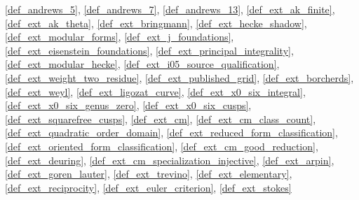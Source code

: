 \documentclass[11pt,a4paper]{article}
\numberwithin{equation}{section}
\theoremstyle{plain}\newtheorem{theorem}{Theorem}[section]\newaliascnt{proposition}{theorem}\newtheorem{proposition}[proposition]{Proposition}\aliascntresetthe{proposition}\newaliascnt{lemma}{theorem}\newtheorem{lemma}[lemma]{Lemma}\aliascntresetthe{lemma}
\theoremstyle{definition}\newaliascnt{definition}{theorem}\newtheorem{definition}[definition]{Definition}\aliascntresetthe{definition}\newaliascnt{notation}{theorem}\newtheorem{notation}[notation]{Notation}\aliascntresetthe{notation}
\begin{document}
\begin{uses-statement}\ref{def_andrews_5}, \ref{def_andrews_7}, \ref{def_andrews_13}, \ref{def_ext_ak_finite}, \ref{def_ext_ak_theta}, \ref{def_ext_bringmann}, \ref{def_ext_hecke_shadow}, \ref{def_ext_modular_forms}, \ref{def_ext_j_foundations}, \ref{def_ext_eisenstein_foundations}, \ref{def_ext_principal_integrality}, \ref{def_ext_modular_hecke}, \ref{def_ext_i05_source_qualification}, \ref{def_ext_weight_two_residue}, \ref{def_ext_published_grid}, \ref{def_ext_borcherds}, \ref{def_ext_weyl}, \ref{def_ext_ligozat_curve}, \ref{def_ext_x0_six_integral}, \ref{def_ext_x0_six_genus_zero}, \ref{def_ext_x0_six_cusps}, \ref{def_ext_squarefree_cusps}, \ref{def_ext_cm}, \ref{def_ext_cm_class_count}, \ref{def_ext_quadratic_order_domain}, \ref{def_ext_reduced_form_classification}, \ref{def_ext_oriented_form_classification}, \ref{def_ext_cm_good_reduction}, \ref{def_ext_deuring}, \ref{def_ext_cm_specialization_injective}, \ref{def_ext_arpin}, \ref{def_ext_goren_lauter}, \ref{def_ext_trevino}, \ref{def_ext_elementary}, \ref{def_ext_reciprocity}, \ref{def_ext_euler_criterion}, \ref{def_ext_stokes}\end{uses-statement}
\end{document}
